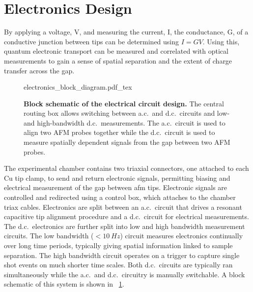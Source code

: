 \documentclass{article}
\begin{document}
\section{Electronics Design}

By applying a voltage, \gls{V}, and measuring the current, \gls{I}, the conductance, \gls{G}, of a conductive junction between tips can be determined using $I=GV$. Using this, quantum electronic transport can be measured and correlated with optical measurements to gain a sense of spatial separation and the extent of charge transfer across the gap. %

\begin{figure}[bt]
\centering
\fontsize{10pt}{1em}\selectfont
{electronics_block_diagram.pdf_tex}
\caption[Block schematic of the electrical circuit design.]{\textbf{Block schematic of the electrical circuit design.} The central routing box allows switching between a.c.\ and d.c.\ circuits and low-and high-bandwidth d.c.\ measurements. The a.c.\ circuit is used to align two AFM probes together while the d.c.\ circuit is used to measure spatially dependent signals from the gap between two AFM probes.}
\label{fig:block_circuit_design}
\end{figure}

The experimental chamber contains two triaxial connectors, one attached to each Cu tip clamp, to send and return electronic signals, permitting biasing and electrical measurement of the gap between \gls{afm} tips. Electronic signals are controlled and redirected using a control box, which attaches to the chamber triax cables. Electronics are split between an a.c.\ circuit that drives a resonant capacitive tip alignment procedure and a d.c.\ circuit for electrical measurements. The d.c.\ electronics are further split into low and high bandwidth measurement circuits. The low bandwidth ($<\SI{10}{Hz}$) circuit measures electronics continually over long time periods, typically giving spatial information linked to sample separation. The high bandwidth circuit operates on a trigger to capture single shot events on much shorter time scales. Both d.c.\ circuits are typically ran simultaneously while the a.c.\ and d.c.\ circuitry is manually switchable. A block schematic of this system is shown in \figurename~\ref{fig:block_circuit_design}.
\end{document}
